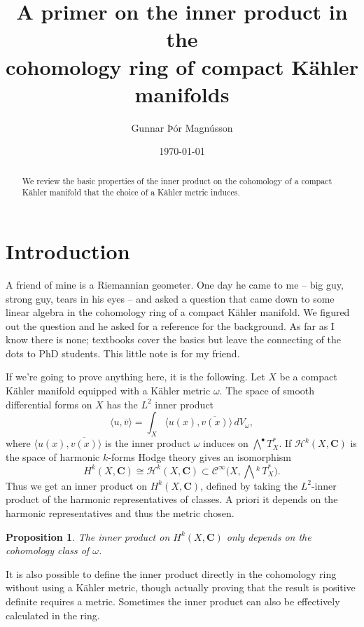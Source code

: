 \documentclass[11pt]{article}
\author{Gunnar Þór Magnússon}
\date{\today}
\title{A primer on the inner product in the\\cohomology ring of compact K\"ahler manifolds}
\newtheorem{prop}[theo]{Proposition}
\theoremstyle{definition}
\newcommand{\cc}[1]{\mathcal{#1}}
\def\ov#1{\overline{#1}}
\def\<{\langle}
\def\>{\rangle}
\def\CC{\mathbf{C}}
\def\HH{\mathcal{H}}
\begin{document}
\maketitle

\begin{abstract}
We review the basic properties of the inner product on the cohomology of a compact K\"ahler manifold that the choice of a K\"ahler metric induces.
\end{abstract}


\section*{Introduction}

A friend of mine is a Riemannian geometer.
One day he came to me -- big guy, strong guy, tears in his eyes -- and asked a question that came down to some linear algebra in the cohomology ring of a compact K\"ahler manifold.
We figured out the question and he asked for a reference for the background.
As far as I know there is none; textbooks cover the basics but leave the connecting of the dots to PhD students.
This little note is for my friend.

If we're going to prove anything here, it is the following.
Let $X$ be a compact K\"ahler manifold equipped with a K\"ahler metric $\omega$.
The space of smooth differential forms on $X$ has the $L^2$ inner product
\[
\< u, \bar v \>
= \int_X \< u(x), \ov{v(x)} \> \, dV_\omega,
\]
where $\< u(x), \ov{v(x)} \>$ is the inner product $\omega$ induces on $\bigwedge^\bullet T_X^*$.
If $\HH^k(X, \CC)$ is the space of harmonic $k$-forms Hodge theory gives an isomorphism
\[
H^k(X,\CC)
\cong \HH^k(X,\CC) 
\subset \cc C^\infty\bigl(X, \bigwedge\!\!{}^k\, T_X^*\bigr).
\]
Thus we get an inner product on $H^k(X,\CC)$, defined by taking the $L^2$-inner product of the harmonic representatives of classes.
A priori it depends on the harmonic representatives and thus the metric chosen.

\begin{prop}
The inner product on $H^k(X,\CC)$ only depends on the cohomology class of $\omega$.
\end{prop}

It is also possible to define the inner product directly in the cohomology ring without using a K\"ahler metric, though actually proving that the result is positive definite requires a metric.
Sometimes the inner product can also be effectively calculated in the ring.
\end{document}
